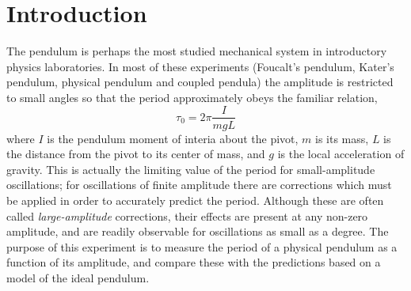 \documentclass{revtex4}
\begin{document}
%
%
%
%

\section{Introduction}

The pendulum is perhaps the most studied mechanical system in
introductory physics laboratories. In most of these
experiments (Foucalt's pendulum, Kater's pendulum, physical
pendulum and coupled pendula) the amplitude is restricted to
small angles so that the period approximately obeys the familiar relation,
\begin{equation}
\tau_0 = 2\pi\frac{I}{mgL}
\label{eq:omega0}
\end{equation}
where $I$ is the pendulum moment of interia about the pivot, $m$ is its
mass, $L$ is the distance from the pivot to its center of mass, and $g$ is
the local acceleration of gravity.  This is actually the limiting value
of the period for small-amplitude oscillations; for oscillations of finite
amplitude there are corrections which must be applied in order to accurately
predict the period.  Although these are often called {\em large-amplitude}
corrections, their effects are present at any non-zero amplitude, and are
readily observable for oscillations as small as a degree.  The purpose of
this experiment is to measure the period of a physical pendulum as a
function of its amplitude, and compare these with the predictions based
on a model of the ideal pendulum.
\end{document}
